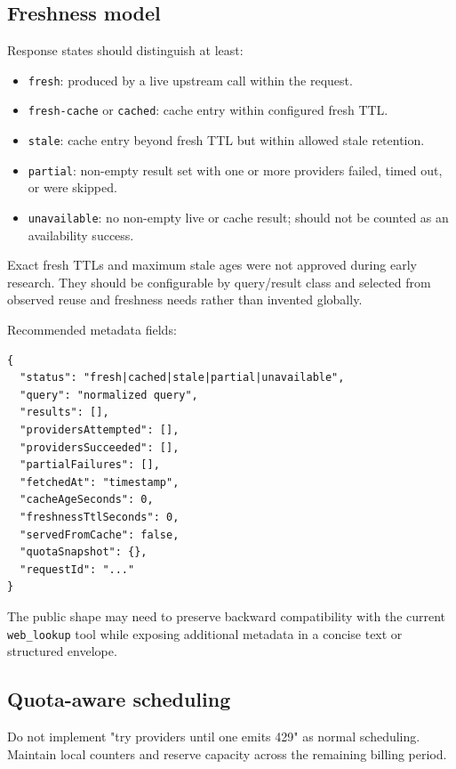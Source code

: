 \documentclass[11pt]{article}
\begin{document}
\subsection*{Freshness model}
\label{sec:orgfc99731}

Response states should distinguish at least:

\begin{itemize}
\item \texttt{fresh}: produced by a live upstream call within the request.
\item \texttt{fresh-cache} or \texttt{cached}: cache entry within configured fresh TTL.
\item \texttt{stale}: cache entry beyond fresh TTL but within allowed stale retention.
\item \texttt{partial}: non-empty result set with one or more providers failed, timed out,
or were skipped.
\item \texttt{unavailable}: no non-empty live or cache result; should not be counted as an
availability success.
\end{itemize}

Exact fresh TTLs and maximum stale ages were not approved during early
research.  They should be configurable by query/result class and selected from
observed reuse and freshness needs rather than invented globally.

Recommended metadata fields:

\begin{verbatim}
{
  "status": "fresh|cached|stale|partial|unavailable",
  "query": "normalized query",
  "results": [],
  "providersAttempted": [],
  "providersSucceeded": [],
  "partialFailures": [],
  "fetchedAt": "timestamp",
  "cacheAgeSeconds": 0,
  "freshnessTtlSeconds": 0,
  "servedFromCache": false,
  "quotaSnapshot": {},
  "requestId": "..."
}
\end{verbatim}

The public shape may need to preserve backward compatibility with the current
\texttt{web\_lookup} tool while exposing additional metadata in a concise text or
structured envelope.
\subsection*{Quota-aware scheduling}
\label{sec:orgde30be6}

Do not implement "try providers until one emits 429" as normal scheduling.
Maintain local counters and reserve capacity across the remaining billing
period.
\end{document}

